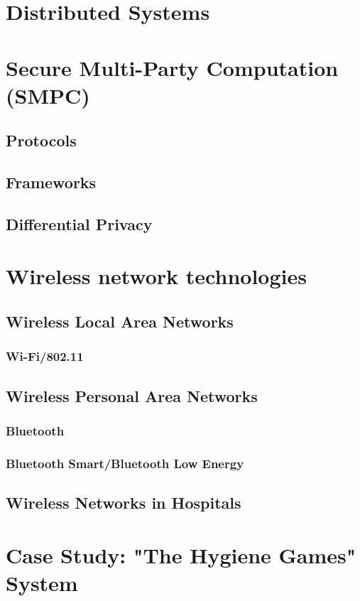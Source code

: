 	\section{Distributed Systems}
	\section{Secure Multi-Party Computation (SMPC)}
	\subsection*{Protocols}
	\subsection*{Frameworks}
	\subsection*{Differential Privacy}
	\section{Wireless network technologies}
	\subsection*{Wireless Local Area Networks}
	\subsubsection*{Wi-Fi/802.11}
	\subsection*{Wireless Personal Area Networks}
	\subsubsection*{Bluetooth}
	\subsubsection*{Bluetooth Smart/Bluetooth Low Energy}
	\subsection*{Wireless Networks in Hospitals}
	\section{Case Study: "The Hygiene Games" System}

